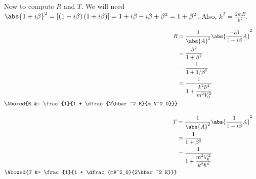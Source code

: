 \documentclass{article}
\begin{document}
	Now to compute $R$ and $T$. We will need $\abs{1 + i\beta}^2 = \left[ \left( 1 - i\beta \right) \left( 1 + i\beta \right) \right] = 1 + i\beta - i\beta + \beta^2 = 1 + \beta^2$. Also, $k^2 = \frac{2mE}{\hbar^2}$. \\
	\begin{minipage}{0.45\textwidth}
		\begin{equation}
			\begin{split}
				R &= \frac{1}{\abs{A}^2} \abs{ \frac{-i\beta}{1 + i\beta} A }^2 \\
				&= \frac{\beta^2}{1 + \beta^2} \\
				&= \frac{1}{1 + 1/\beta^2} \\
				&= \frac{1}{1 + \dfrac{k^2 \hbar^4}{m^2 V^2_0}} \\
				\Aboxed{R &= \frac{1}{1 + \dfrac{2\hbar^2 E}{m V^2_0}}}
			\end{split}
		\end{equation}
	\end{minipage}
	\begin{minipage}{0.45\textwidth}
		\begin{equation}
			\begin{split}
				T &= \frac{1}{\abs{A}^2} \abs{ \frac{1}{1 + i\beta} A }^2 \\
				&= \frac{1}{1 + \beta^2} \\
				&= \frac{1}{1 + \dfrac{m^2V^2_0}{k^2\hbar^4}} \\
				\Aboxed{T &= \frac{1}{1 + \dfrac{mV^2_0}{2\hbar^2 E}}}
			\end{split}
		\end{equation}
	\end{minipage}
	
\end{document}
